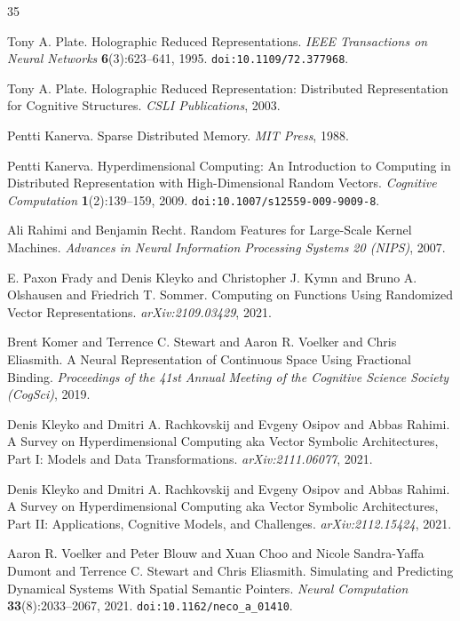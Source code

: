 \documentclass[11pt]{article}
\begin{document}
\begin{thebibliography}{35}

Tony A. Plate.
\newblock Holographic Reduced Representations.
\newblock \emph{IEEE Transactions on Neural Networks}
\textbf{6}(3):623--641, 1995.
\newblock \texttt{doi:10.1109/72.377968}.

Tony A. Plate.
\newblock Holographic Reduced Representation: Distributed Representation
for Cognitive Structures.
\newblock \emph{CSLI Publications}, 2003.

Pentti Kanerva.
\newblock Sparse Distributed Memory.
\newblock \emph{MIT Press}, 1988.

Pentti Kanerva.
\newblock Hyperdimensional Computing: An Introduction to Computing in
Distributed Representation with High-Dimensional Random Vectors.
\newblock \emph{Cognitive Computation} \textbf{1}(2):139--159, 2009.
\newblock \texttt{doi:10.1007/s12559-009-9009-8}.

Ali Rahimi and Benjamin Recht.
\newblock Random Features for Large-Scale Kernel Machines.
\newblock \emph{Advances in Neural Information Processing Systems 20
(NIPS)}, 2007.

E. Paxon Frady and Denis Kleyko and Christopher J. Kymn and Bruno A.
Olshausen and Friedrich T. Sommer.
\newblock Computing on Functions Using Randomized Vector
Representations.
\newblock \emph{arXiv:2109.03429}, 2021.

Brent Komer and Terrence C. Stewart and Aaron R. Voelker and Chris
Eliasmith.
\newblock A Neural Representation of Continuous Space Using Fractional
Binding.
\newblock \emph{Proceedings of the 41st Annual Meeting of the Cognitive
Science Society (CogSci)}, 2019.

Denis Kleyko and Dmitri A. Rachkovskij and Evgeny Osipov and Abbas
Rahimi.
\newblock A Survey on Hyperdimensional Computing aka Vector Symbolic
Architectures, Part I: Models and Data Transformations.
\newblock \emph{arXiv:2111.06077}, 2021.

Denis Kleyko and Dmitri A. Rachkovskij and Evgeny Osipov and Abbas
Rahimi.
\newblock A Survey on Hyperdimensional Computing aka Vector Symbolic
Architectures, Part II: Applications, Cognitive Models, and Challenges.
\newblock \emph{arXiv:2112.15424}, 2021.

Aaron R. Voelker and Peter Blouw and Xuan Choo and Nicole Sandra-Yaffa
Dumont and Terrence C. Stewart and Chris Eliasmith.
\newblock Simulating and Predicting Dynamical Systems With Spatial
Semantic Pointers.
\newblock \emph{Neural Computation} \textbf{33}(8):2033--2067, 2021.
\newblock \texttt{doi:10.1162/neco\_a\_01410}.


\end{thebibliography}
\end{document}
